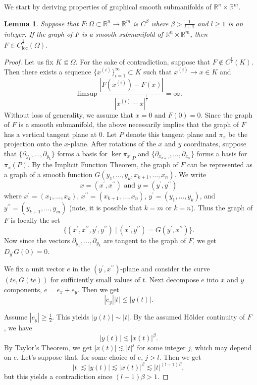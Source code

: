 \documentclass[12pt,reqno]{amsart}%
\theoremstyle{plain}
\newtheorem{lemma}[theorem]{Lemma}
\numberwithin{equation}{section}
\theoremstyle{definition}
\theoremstyle{remark}
\newcommand{\R}{\mathbb{R}}
\begin{document}
\medskip

 We start by deriving properties of graphical smooth submanifolds of $\mathbb{R}^n\times \R^m$.

    \begin{lemma} \label{HolderImprovement}
Suppose that $F: \Omega  \subset  \R^n \to \R^m $ is $C^{\beta}$ where $\beta > \frac{1}{l+1}$ and $l \geq 1$ is an integer. If the graph of $F$ is a smooth submanifold of $\R^n \times \R^m$, then $F \in C^{\frac 1 l}_{\mathrm{loc}}( \Omega) .$ 
\end{lemma}

\begin{proof} Let us fix $K \Subset \Omega$. For the sake of contradiction, suppose that $F \notin C^{\frac 1 l } (K).$ Then there exists a sequence $\{x^{(i)}\}_{i=1}^\infty\subset K $ such that $x^{(i)} \to x \in K$ and 
$$ \limsup \frac{ |F(x^{(i)} )-F(x) |}{|x^{(i)} - x| ^{\frac1l}}   = \infty.$$
Without loss of generality, we assume that $x=0$ and $F(0) =0$.
Since the graph of $F$ is a smooth submanifold, the above necessarily implies that the graph of $F$ has a vertical tangent plane at $0$. Let $P$ denote this tangent plane and $\pi_x$ be the projection onto the $x$-plane. After rotations of the $x$ and $y$ coordinates, suppose that $\{\partial_{y_1}, \dots, \partial_{y_k}\}$ forms a basis for $\ker \pi_x|_P$ and $\{\partial_{x_{k+1}}, \dots, \partial _{x_n}\}$ forms a basis for $\pi_x ( P) .$ By the Implicit Function Theorem, the graph of $F$ can be represented as a graph of a smooth function $G(y_1, \dots, y_k, x_{k+1}, \dots , x_n ).$ 
We write \[x = ( x^\prime , x^{\prime \prime } ) \text{ and } y = ( y^\prime , y^{\prime \prime } )\] where $x^\prime =  (x_1, \dots, x_k)$, $x^{\prime \prime } = ( x_{k+1}, \dots, x_n)$, $y^\prime =  (y_1, \dots, y_k)$, and $y^{\prime \prime } = ( y_{k+1}, \dots, y_m)$ (note, it is possible that $k=m$ or $k=n$). 
Thus the graph of $F$ is locally the set
$$ \{ (x^\prime , x^{\prime \prime} , y^\prime , y^{\prime   \prime } ) \: | \: ( x^\prime, y^{\prime \prime })= G ( y^\prime , x^{\prime \prime } ) \} .$$
Now since the vectors $\partial_{y_1}, \dots, \partial_{y_k}$ are tangent to the graph of $F$, we get $D_{y^\prime } G(0) =0.$

We fix a unit vector $e$ in the $(y^\prime , x^{\prime \prime } ) $-plane and consider the curve $(te, G(te))$ for sufficiently small values of $t$. Next decompose $e$ into $x$ and $y$ components, $e = e_x + e_y$. Then we get
\[|e_y||t| \leq |y(t)|.\]


Assume $|e_y| \geq \frac 12.$ This yields $|y(t)| \sim |t|$. By the assumed H\"older continuity of $F$, we have
$$  |y(t) | \lesssim  | x(t)|^\beta .$$
By Taylor's Theorem, we get $|x(t) | \lesssim |t|^j$ for some integer $j$, which may depend on $e$. Let's suppose that, for some choice of $e$, $j> l$. Then we get
$$  |t| \lesssim |y(t) | \lesssim|x(t)|^\beta \lesssim   |t|^{(l+1) \beta }, $$
but this yields a contradiction since $(l+1) \beta >1.$ 


\end{proof}
\end{document}
